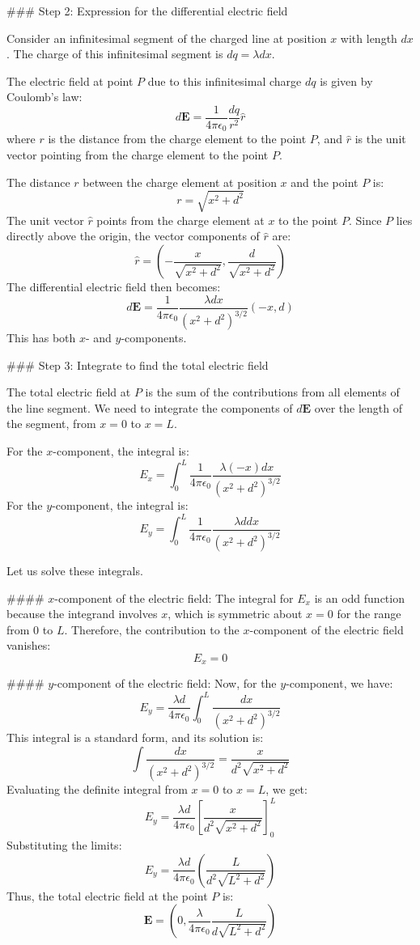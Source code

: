 ### Step 2: Expression for the differential electric field

Consider an infinitesimal segment of the charged line at position \( x \) with length \( dx \). The charge of this infinitesimal segment is \( dq = \lambda dx \).

The electric field at point \( P \) due to this infinitesimal charge \( dq \) is given by Coulomb's law:
\[
d\mathbf{E} = \frac{1}{4\pi \epsilon_0} \frac{dq}{r^2} \hat{r}
\]
where \( r \) is the distance from the charge element to the point \( P \), and \( \hat{r} \) is the unit vector pointing from the charge element to the point \( P \).

The distance \( r \) between the charge element at position \( x \) and the point \( P \) is:
\[
r = \sqrt{x^2 + d^2}
\]
The unit vector \( \hat{r} \) points from the charge element at \( x \) to the point \( P \). Since \( P \) lies directly above the origin, the vector components of \( \hat{r} \) are:
\[
\hat{r} = \left( -\frac{x}{\sqrt{x^2 + d^2}}, \frac{d}{\sqrt{x^2 + d^2}} \right)
\]
The differential electric field then becomes:
\[
d\mathbf{E} = \frac{1}{4\pi \epsilon_0} \frac{\lambda dx}{(x^2 + d^2)^{3/2}} \left( -x, d \right)
\]
This has both \( x \)- and \( y \)-components.

### Step 3: Integrate to find the total electric field

The total electric field at \( P \) is the sum of the contributions from all elements of the line segment. We need to integrate the components of \( d\mathbf{E} \) over the length of the segment, from \( x = 0 \) to \( x = L \).

For the \( x \)-component, the integral is:
\[
E_x = \int_0^L \frac{1}{4\pi \epsilon_0} \frac{\lambda (-x) dx}{(x^2 + d^2)^{3/2}}
\]
For the \( y \)-component, the integral is:
\[
E_y = \int_0^L \frac{1}{4\pi \epsilon_0} \frac{\lambda d dx}{(x^2 + d^2)^{3/2}}
\]

Let us solve these integrals.

#### \( x \)-component of the electric field:
The integral for \( E_x \) is an odd function because the integrand involves \( x \), which is symmetric about \( x = 0 \) for the range from \( 0 \) to \( L \). Therefore, the contribution to the \( x \)-component of the electric field vanishes:
\[
E_x = 0
\]

#### \( y \)-component of the electric field:
Now, for the \( y \)-component, we have:
\[
E_y = \frac{\lambda d}{4\pi \epsilon_0} \int_0^L \frac{dx}{(x^2 + d^2)^{3/2}}
\]
This integral is a standard form, and its solution is:
\[
\int \frac{dx}{(x^2 + d^2)^{3/2}} = \frac{x}{d^2 \sqrt{x^2 + d^2}}
\]
Evaluating the definite integral from \( x = 0 \) to \( x = L \), we get:
\[
E_y = \frac{\lambda d}{4\pi \epsilon_0} \left[ \frac{x}{d^2 \sqrt{x^2 + d^2}} \right]_0^L
\]
Substituting the limits:
\[
E_y = \frac{\lambda d}{4\pi \epsilon_0} \left( \frac{L}{d^2 \sqrt{L^2 + d^2}} \right)
\]
Thus, the total electric field at the point \( P \) is:
\[
\mathbf{E} = \left( 0, \frac{\lambda}{4\pi \epsilon_0} \frac{L}{d \sqrt{L^2 + d^2}} \right)
\]

